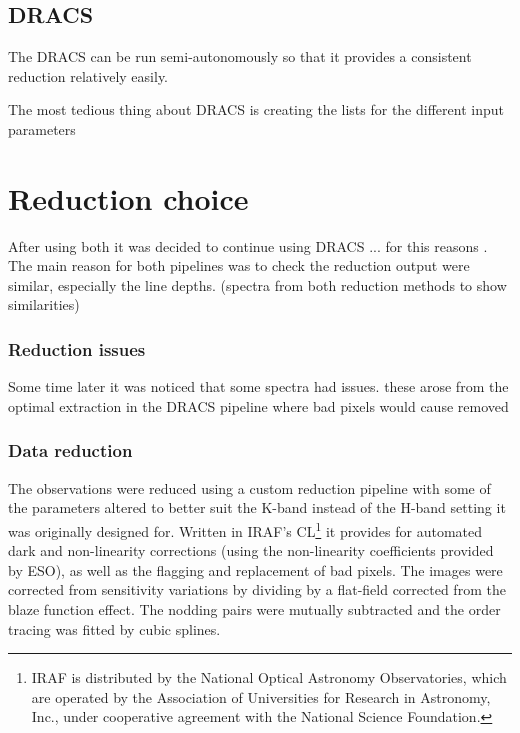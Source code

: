 \subsection{DRACS}

The DRACS can be run semi-autonomously so that it provides a consistent reduction relatively easily.


The most tedious thing about DRACS is creating the lists for the different input parameters




\section{Reduction choice }

After using both it was decided to continue using DRACS ... for this reasons
. 
The main reason for both pipelines was to check the reduction output were similar, especially the line depths.
\missingfigure(spectra from both reduction methods to show similarities)


\subsubsection{Reduction issues}

Some time later it was noticed that some spectra had issues. these arose from the optimal extraction in the DRACS pipeline where bad pixels would cause removed


\subsubsection{Data reduction}
\label{subsubsec:reduction}
The observations were reduced using a custom reduction pipeline \citep{figueira_radial_2010} with some of the parameters altered to better suit the K-band instead of the H-band setting it was originally designed for. Written in IRAF's CL\footnote{IRAF is distributed by the National Optical Astronomy Observatories, which are operated by the Association of Universities for Research in Astronomy, {Inc.}, under cooperative agreement with the National Science Foundation.} \citep{tody_iraf_1993} it provides for automated dark and non-linearity corrections (using the non-linearity coefficients provided by ESO), as well as the flagging and replacement of bad pixels. The images were corrected from sensitivity variations by dividing by a flat-field corrected from the blaze function effect. The nodding pairs were mutually subtracted and the order tracing was fitted by cubic splines.  

